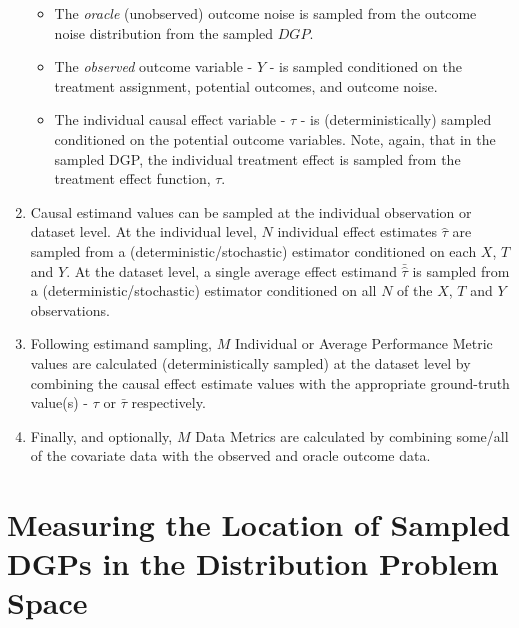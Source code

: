 \documentclass[../main.tex]{subfiles}
\begin{document}
\begin{enumerate}
\begin{itemize}
   \item The \textit{oracle} (unobserved) outcome noise is sampled from the outcome noise distribution from the sampled $DGP$.

   \item The \textit{observed} outcome variable - $Y$ - is sampled conditioned on the treatment assignment, potential outcomes, and outcome noise.

   \item The individual causal effect variable - $\tau$ - is (deterministically) sampled conditioned on the potential outcome variables. Note, again, that in the sampled DGP, the individual treatment effect is sampled from the treatment effect function, $\tau$.

\end{itemize}

\item Causal estimand values can be sampled at the individual observation or dataset level. At the individual level, $N$ individual effect estimates $\hat{\tau}$ are sampled from a (deterministic/stochastic) estimator conditioned on each $X$, $T$ and $Y$. At the dataset level, a single average effect estimand $\bar{\hat{\tau}}$ is sampled from a (deterministic/stochastic) estimator conditioned on all $N$ of the $X$, $T$ and $Y$ observations.

\item Following estimand sampling, $M$ Individual or Average Performance Metric values are calculated (deterministically sampled) at the dataset level by combining the causal effect estimate values with the appropriate ground-truth value(s) - $\tau$ or $\bar{\tau}$ respectively.

\item Finally, and optionally, $M$ Data Metrics are calculated by combining some/all of the covariate data with the observed and oracle outcome data.

\end{enumerate}

\section{Measuring the Location of Sampled DGPs in the Distribution Problem Space}
\label{sec:measuring-distributional-setting}
\end{document}
